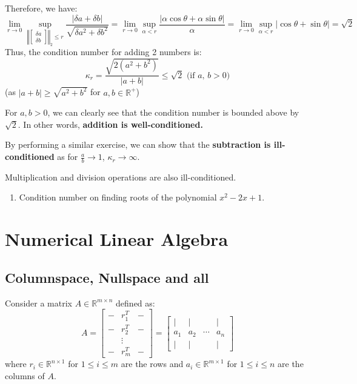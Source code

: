 \documentclass[
]{book}
\providecommand{\tightlist}{%
  \setlength{\itemsep}{0pt}\setlength{\parskip}{0pt}}
\begin{document}
Therefore, we have:
\[\lim_{r\to 0} \sup_{\left\Vert\begin{bmatrix} \delta a\\ \delta b \end{bmatrix}\right\Vert_2\le r}\dfrac{|\delta a+\delta b|}{\sqrt{\delta a^2+\delta b^2}} = \lim_{r \to 0} \sup_{\alpha < r} \dfrac{|\alpha \cos \theta+\alpha \sin \theta|}{\alpha} = \lim_{r\to 0} \sup_{\alpha<r}|\cos \theta+\sin \theta| = \sqrt{2}\]
Thus, the condition number for adding 2 numbers is:
\[ \kappa_r = \dfrac{\sqrt{2(a^2+b^2)}}{|a+b|}\le \sqrt{2} \text{ (if $a,\, b>0$)}\]
(as \(|a+b| \ge \sqrt{a^2+b^2}\) for \(a,b \in \mathbb{R}^+\))

For \(a,b>0\), we can clearly see that the condition number is bounded above by \(\sqrt{2}\). In other words, \textbf{addition is well-conditioned.}

By performing a similar exercise, we can show that the \textbf{subtraction is ill-conditioned} as for \(\frac{a}{b} \to 1\), \(\kappa_r \to \infty\).

Multiplication and division operations are also ill-conditioned.

\begin{enumerate}
\def\labelenumi{\arabic{enumi}.}
\setcounter{enumi}{1}
\tightlist
\item
  Condition number on finding roots of the polynomial \(x^2-2x+1\).
\end{enumerate}

\hypertarget{numerical-linear-algebra}{%
\chapter{Numerical Linear Algebra}\label{numerical-linear-algebra}}

\hypertarget{columnspace-nullspace-and-all}{%
\section{Columnspace, Nullspace and all}\label{columnspace-nullspace-and-all}}

Consider a matrix \(A\in\mathbb{R}^{m\times n}\) defined as:
\[A = \begin{bmatrix} -&r_1^T&-\\ -&r_2^T&-\\ & \vdots& \\ - & r_m^T& - \end{bmatrix} = \begin{bmatrix} | & | &  & | \\ a_1 & a_2 &\cdots & a_n \\ | & | & & |\end{bmatrix}\]
where \(r_i \in \mathbb{R}^{n\times 1}\) for \(1\le i \le m\) are the rows and \(a_i \in \mathbb{R}^{m\times 1}\) for \(1\le i\le n\) are the columns of \(A\).
\end{document}
